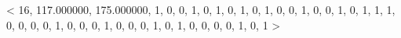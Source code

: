 < 16, 117.000000, 175.000000, 1, 0, 0, 1, 0, 1, 0, 1, 0, 1, 0, 0, 1, 0, 0, 1, 0, 1, 1, 1, 0, 0, 0, 0, 1, 0, 0, 0, 1, 0, 0, 0, 1, 0, 1, 0, 0, 0, 0, 1, 0, 1 > 


